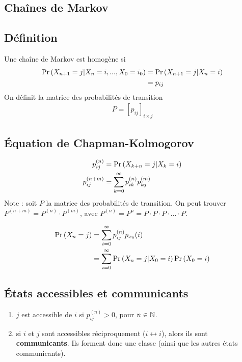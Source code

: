 \documentclass[10pt, french, landscape]{article}
\begin{document}
\begin{multicols*}{3}
\section{Chaînes de Markov}
\subsection*{Définition}
Une chaîne de Markov est homogène si
\begin{align*}
\Pr \left( X_{n+1} = j | X_{n}=i, ..., X_0 = i_0 \right) & = \Pr \left( X_{n+1} = j | X_n = i \right)  \\
 & = p_{ij} \\
\end{align*}
On définit la matrice des probabilités de transition
\begin{align*}
P = [p_{ij}]_{i \times j}  
\end{align*}

\subsection*{Équation de Chapman-Kolmogorov}
\begin{align*}
p_{ij}^{(n)} 	& = \Pr \left( X_{k+n} = j | X_k = i \right) \\
p_{ij}^{(n+m)} 	& = \sum_{k=0}^{\infty} p_{ik}^{(n)} p_{kj}^{(m)} \\
\end{align*}
Note : soit $P$ la matrice des probabilités de transition. On peut trouver $P^{(n+m)} = P^{(n)} \cdot P^{(m)}$, avec $P^{(n)} = P^n = P\cdot P \cdot P \cdot ... \cdot P$.

\begin{align*}
\Pr \left( X_n = j \right) & = \sum_{i=0}^{\infty} p_{ij}^{(n)} p_{x_0}(i) \\
	& = \sum_{i=0}^{\infty} \Pr \left( X_n = j | X_0 = i \right) \Pr \left( X_0 = i \right) \\
\end{align*}

\subsection*{États accessibles et communicants}
\begin{enumerate}[label=\faAngleRight]
\item $j$ est accessible de $i$ si $p_{ij}^{(n)} >0$, pour $n \in \mathbb{N}$.

\item si $i$ et $j$ sont accessibles réciproquement ($i \leftrightarrow i$), alors ils sont \textbf{communicants}. Ils forment donc une classe (ainsi que les autres états communicants).


\end{enumerate}
\end{multicols*}
\end{document}
